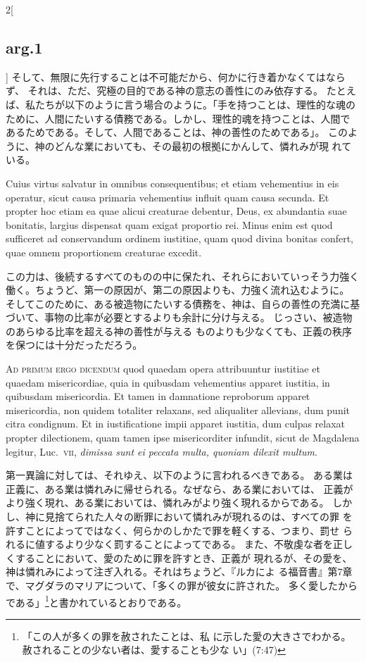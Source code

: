 \documentclass[paper=a4paper,fontsize=10pt,jafontsize=9pt,titlepage]{jlreq}
\begin{document}
\begin{paracol}{2}[\subsection{arg.1}]
そして、無限に先行することは不可能だから、何かに行き着かなくてはならず、
 それは、ただ、究極の目的である神の意志の善性にのみ依存する。
たとえば、私たちが以下のように言う場合のように。「手を持つことは、理性的な魂の
 ために、人間にたいする債務である。しかし、理性的魂を持つことは、人間で
 あるためである。そして、人間であることは、神の善性のためである」。
このように、神のどんな業においても、その最初の根拠にかんして、憐れみが現
 れている。

\switchcolumn*

Cuius virtus salvatur in omnibus
consequentibus; et etiam vehementius in eis operatur, sicut causa
primaria vehementius influit quam causa secunda. Et propter hoc etiam ea
quae alicui creaturae debentur, Deus, ex abundantia suae bonitatis,
largius dispensat quam exigat proportio rei. Minus enim est quod
sufficeret ad conservandum ordinem iustitiae, quam quod divina bonitas
confert, quae omnem proportionem creaturae excedit.

\switchcolumn

この力は、後続するすべてのものの中に保たれ、それらにおいていっそう力強く
 働く。ちょうど、第一の原因が、第二の原因よりも、力強く流れ込むように。
そしてこのために、ある被造物にたいする債務を、神は、自らの善性の充満に基
 づいて、事物の比率が必要とするよりも余計に分け与える。
じっさい、被造物のあらゆる比率を超える神の善性が与える
 ものよりも少なくても、正義の秩序を保つには十分だっただろう。

\switchcolumn*[\subsection{ad.1}]

{\scshape Ad primum ergo dicendum} quod quaedam opera
attribuuntur iustitiae et quaedam misericordiae, quia in quibusdam
vehementius apparet iustitia, in quibusdam misericordia. Et tamen in
damnatione reproborum apparet misericordia, non quidem totaliter
relaxans, sed aliqualiter allevians, dum punit citra condignum. Et in
iustificatione impii apparet iustitia, dum culpas relaxat propter
dilectionem, quam tamen ipse misericorditer infundit, sicut de Magdalena
legitur, Luc.~{\scshape vii}, {\itshape dimissa sunt ei peccata multa, quoniam dilexit
multum}.

\switchcolumn

第一異論に対しては、それゆえ、以下のように言われるべきである。
ある業は正義に、ある業は憐れみに帰せられる。なぜなら、ある業においては、
 正義がより強く現れ、ある業においては、憐れみがより強く現れるからである。
しかし、神に見捨てられた人々の断罪において憐れみが現れるのは、すべての罪
 を許すことによってではなく、何らかのしかたで罪を軽くする、つまり、罰せ
 られるに値するより少なく罰することによってである。
また、不敬虔な者を正しくすることにおいて、愛のために罪を許すとき、正義が
 現れるが、その愛を、神は憐れみによって注ぎ入れる。それはちょうど、『ルカによ
 る福音書』第7章で、マグダラのマリアについて、「多くの罪が彼女に許された。
 多く愛したからである」\footnote{「この人が多くの罪を赦されたことは、私
 に示した愛の大きさでわかる。赦されることの少ない者は、愛することも少な
 い」(7:47)}と書かれているとおりである。


\end{paracol}
\end{document}
